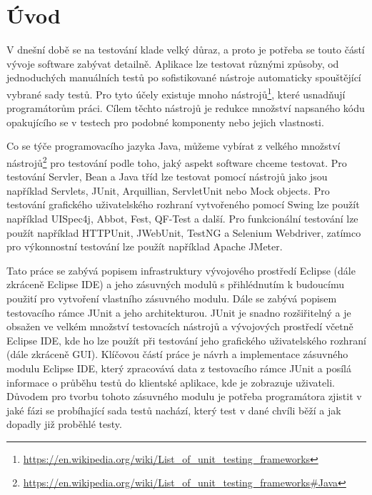 
\chapter{Úvod}                                                            %
V dnešní době se na testování klade velký důraz, a proto je potřeba se touto částí vývoje software zabývat detailně. Aplikace lze testovat různými způsoby, od jednoduchých manuálních testů po sofistikované nástroje automaticky spouštějící vybrané sady testů. Pro tyto účely existuje mnoho nástrojů\footnote{\url{https://en.wikipedia.org/wiki/List_of_unit_testing_frameworks}}, které usnadňují programátorům práci. Cílem těchto nástrojů je redukce množství napsaného kódu opakujícího se v testech pro podobné komponenty nebo jejich vlastnosti.

Co se týče programovacího jazyka Java, můžeme vybírat z velkého množství nástrojů\footnote{\url{https://en.wikipedia.org/wiki/List_of_unit_testing_frameworks\#Java}} pro testování podle toho, jaký aspekt software chceme testovat. Pro testování Servler, Bean a Java tříd lze testovat pomocí nástrojů jako jsou například Servlets, JUnit, Arquillian, ServletUnit nebo Mock objects. Pro testování grafického uživatelského rozhraní vytvořeného pomocí Swing lze použít například UISpec4j, Abbot, Fest, QF-Test a další. Pro funkcionální testování lze použít například HTTPUnit, JWebUnit, TestNG a Selenium Webdriver, zatímco pro výkonnostní testování lze použít například Apache JMeter.

Tato práce se zabývá popisem infrastruktury vývojového prostředí Eclipse (dále zkráceně Eclipse IDE) a jeho zásuvných modulů s přihlédnutím k budoucímu použití pro vytvoření vlastního zásuvného modulu. Dále se zabývá popisem testovacího rámce JUnit a jeho architekturou. JUnit je snadno rozšiřitelný a je obsažen ve velkém množství testovacích nástrojů a vývojových prostředí včetně Eclipse IDE, kde ho lze použít při testování jeho grafického uživatelského rozhraní (dále zkráceně GUI). Klíčovou částí práce je návrh a implementace zásuvného modulu Eclipse IDE, který zpracovává data z testovacího rámce JUnit a posílá informace o průběhu testů do klientské aplikace, kde je zobrazuje uživateli. Důvodem pro tvorbu tohoto zásuvného modulu je potřeba programátora zjistit v jaké fázi se probíhající sada testů nachází, který test v dané chvíli běží a jak dopadly již proběhlé testy.


